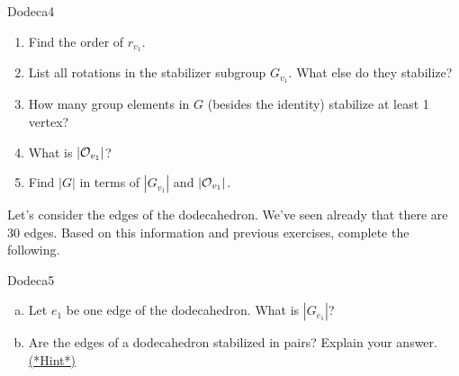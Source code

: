 \begin{exercise}{Dodeca4}
\begin {enumerate} 
\item Find the order of $r_{v_1}$.
\item List all rotations in the stabilizer subgroup $G_{v_1}$.  What else do they stabilize?
\item How many group elements in $G$ (besides the identity) stabilize at least 1 vertex?
\item What is $|{\cal O}_{v_1}|$?
\item Find $|G|$ in terms of $|G_{v_1}|$ and $|{\cal O}_{v_1}|$.
\end{enumerate}
\end{exercise}
Let's consider the edges of the dodecahedron.  We've seen already that there are 30 edges.  Based on this information and previous exercises, complete the following.

\begin {exercise}{Dodeca5}
\begin {enumerate}[(a)]
\item Let $e_1$ be one edge of the dodecahedron. What is $|G_{e_1}|$?
\item Are the edges of a dodecahedron stabilized in pairs?  Explain your answer.
\hyperref[sec:actions:hints]{(*Hint*)}
\end{enumerate}
\end{exercise}

